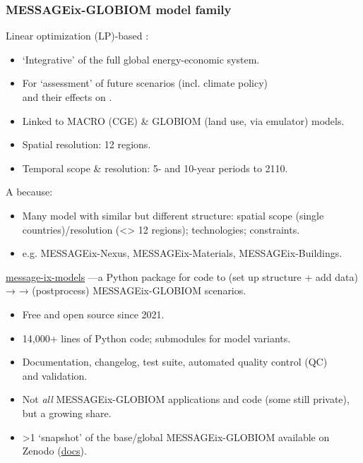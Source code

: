 \documentclass[12pt,aspectratio=169]{beamer}
\begin{document}
\begin{frame}[allowframebreaks]
\frametitle{MESSAGEix-GLOBIOM model family}
Linear optimization (LP)-based :
\begin{itemize}
  \item ‘Integrative’ of the full global energy-economic system.
  \item For ‘assessment’ of future scenarios (incl. climate policy)\\and their effects on .
  \item Linked to MACRO (CGE) \& GLOBIOM (land use, via emulator) models.
  \item Spatial resolution: 12 regions.
  \item Temporal scope \& resolution: 5- and 10-year periods to 2110.
\end{itemize}

\medskip
A  because:
\begin{itemize}
  \item Many model  with similar but different structure: spatial scope (single countries)/resolution (<> 12 regions); technologies; constraints.
  \item e.g. MESSAGEix-Nexus, MESSAGEix-Materials, MESSAGEix-Buildings.
\end{itemize}

\framebreak
\href{https://github.com/iiasa/message-ix-models}{\ttfamily message-ix-models} —a Python package for code to  (set up structure + add data) →  →  (postprocess) MESSAGEix-GLOBIOM scenarios.
\begin{itemize}
  \item Free and open source since 2021.
  \item 14,000+ lines of Python code; submodules for model variants.
  \item Documentation, changelog, test suite, automated quality control (QC)\\and validation.
  \item Not \emph{all} MESSAGEix-GLOBIOM applications and code (some still private),\\but a growing share.
  \item >1 ‘snapshot’ of the base/global MESSAGEix-GLOBIOM available on Zenodo (\href{https://docs.messageix.org/projects/models/en/latest/api/model-snapshot.html}{docs}).
\end{itemize}

\end{frame}
\end{document}
